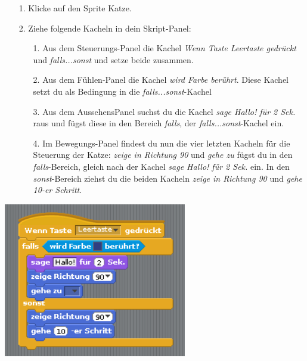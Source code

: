 \begin{itemize}
\item[1. ] Klicke auf den Sprite Katze.
\item[2. ] Ziehe folgende Kacheln in dein Skript-Panel:
  \begin{itemize}
  \item[1. ] Aus dem Steuerungs-Panel die Kachel \textit{Wenn Taste Leertaste gedr{\"u}ckt} und \textit{falls...sonst} und setze beide zusammen.
  \item[2. ] Aus dem F{\"u}hlen-Panel die Kachel \textit{wird Farbe ber{\"u}hrt}. Diese Kachel setzt du als Bedingung in die \textit{falls...sonst}-Kachel
  \item[3. ] Aus dem AussehensPanel suchst du die Kachel \textit{sage Hallo! f{\"u}r 2 Sek.} raus und f{\"u}gst diese in den Bereich \textit{falls}, der \textit{falls...sonst}-Kachel ein.
  \item[4. ] Im Bewegungs-Panel findest du nun die vier letzten Kacheln f{\"u}r die Steuerung der Katze: \textit{zeige in Richtung 90} und \textit{gehe zu} f{\"u}gst du in den \textit{falls}-Bereich, gleich nach der Kachel \textit{sage Hallo! f{\"u}r 2 Sek.} ein. In den \textit{sonst}-Bereich ziehst du die beiden Kacheln \textit{zeige in Richtung 90} und \textit{gehe 10-er Schritt}.
  \end{itemize}
\end{itemize}
\includegraphics[width=0.6\textwidth]{images/aufgabe4_katze_bewegung_default.png}
